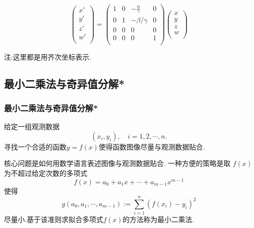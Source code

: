 \begin{frame}
\begin{itemize}
\begin{equation*}
    \begin{pmatrix}x'\\y'\\z'\\w'\\\end{pmatrix}=
    \begin{pmatrix}
    1&0&-\frac\alpha\gamma&0\\0&1&-\beta/\gamma&0\\0&0&0&0\\0&0&0&1\\
    \end{pmatrix}
    \begin{pmatrix}x\\y\\z\\w\\\end{pmatrix}
    \end{equation*}
    \end{itemize}

    注:这里都是用齐次坐标表示.

    \end{frame}





    \subsection{最小二乘法与奇异值分解*}
\begin{frame}\frametitle{最小二乘法与奇异值分解*}
    \begin{question}
    给定一组观测数据
    \[(x_i,y_i),\quad i=1,2,\cdots,n.\]
    寻找一个合适的函数$y=f(x)$使得函数图像尽量与观测数据贴合.
    \end{question}

    核心问题是如何用数学语言表述图像与观测数据贴合. 一种方便的策略是取 $f(x)$为不超过给定次数的多项式
    \[f(x)= a_0+a_1x+\cdots+a_{m-1}x^{m-1}\]
    使得
    \[g(a_0,a_1,\cdots,a_{m-1}):=\sum_{i=1}^n (f(x_i)-y_i)^2\]
    尽量小.基于该准则求拟合多项式$f(x)$的方法称为最小二乘法.
    \end{frame}





